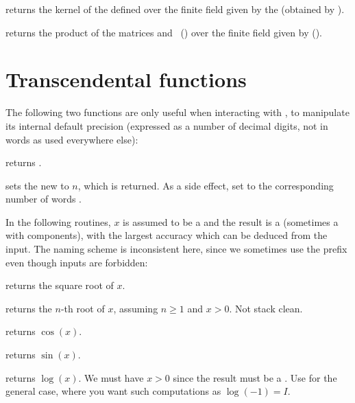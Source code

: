  returns the kernel of the  
defined over the finite field given by the   (obtained
by ).




 returns the product of the
matrices  and~ () over the finite field given
by  ().


\section{Transcendental functions}

The following two functions are only useful when interacting with ,
to manipulate its internal default precision (expressed as a number of
decimal digits, not in words as used everywhere else):

 returns .

 sets the new
 to $n$, which is returned. As a side effect, set
 to the corresponding number of words .


In the following routines, $x$ is assumed to be a  and the result
is a  (sometimes a  with  components), with
the largest accuracy which can be deduced from the input. The naming scheme
is inconsistent here, since we sometimes use the prefix  even though
 inputs are forbidden:

 returns the square root of $x$.

 returns the $n$-th root of $x$, assuming
$n\geq 1$ and $x > 0$. Not stack clean.

 returns $\cos(x)$.

 returns $\sin(x)$.

 returns $\log(x)$. We must have $x > 0$
since the result must be a . Use  for the general case,
where you want such computations as $\log(-1) = I$.

